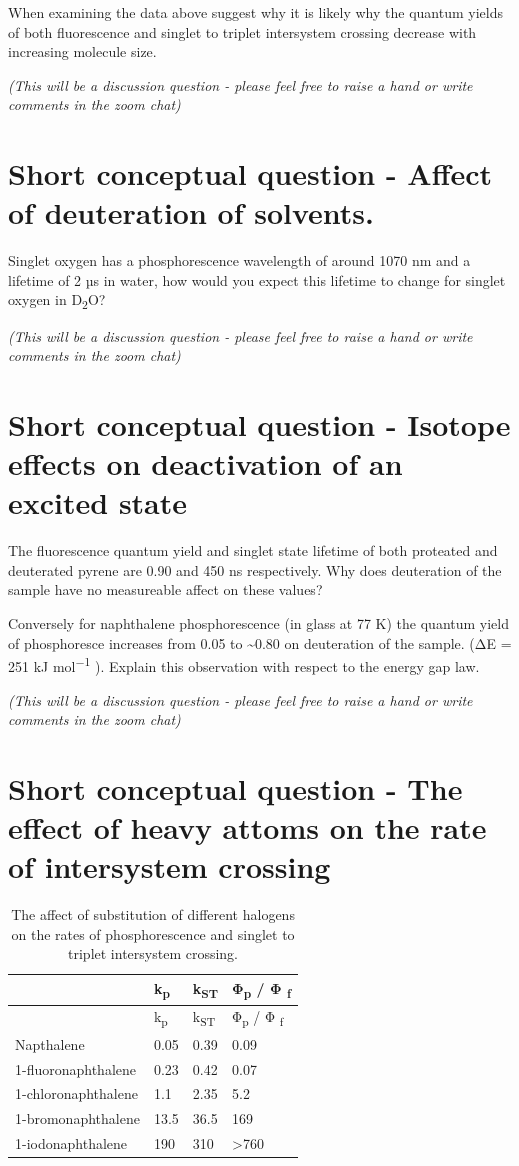\documentclass[
]{book}
\begin{document}
When examining the data above suggest why it is likely why the quantum yields of both fluorescence and singlet to triplet intersystem crossing decrease with increasing molecule size.

\emph{(This will be a discussion question - please feel free to raise a hand or write comments in the zoom chat)}

\hypertarget{sec:dsolvent}{%
\section{Short conceptual question - Affect of deuteration of solvents.}\label{sec:dsolvent}}

Singlet oxygen has a phosphorescence wavelength of around 1070 nm and a lifetime of 2 µs in water, how would you expect this lifetime to change for singlet oxygen in D\textsubscript{2}O?

\emph{(This will be a discussion question - please feel free to raise a hand or write comments in the zoom chat)}

\hypertarget{sec:isotope}{%
\section{Short conceptual question - Isotope effects on deactivation of an excited state}\label{sec:isotope}}

The fluorescence quantum yield and singlet state lifetime of both proteated and deuterated pyrene are 0.90 and 450 ns respectively. Why does deuteration of the sample have no measureable affect on these values?

Conversely for naphthalene phosphorescence (in glass at 77 K) the quantum yield of phosphoresce increases from 0.05 to \textasciitilde0.80 on deuteration of the sample. (ΔE = 251 kJ mol\textsuperscript{−1} ). Explain this observation with respect to the energy gap law.

\emph{(This will be a discussion question - please feel free to raise a hand or write comments in the zoom chat)}

\hypertarget{sec:heavy}{%
\section{Short conceptual question - The effect of heavy attoms on the rate of intersystem crossing}\label{sec:heavy}}

\begin{longtable}[]{@{}llll@{}}
\caption{\label{tab:heavyatom} The affect of substitution of different halogens on the rates of phosphorescence and singlet to triplet intersystem crossing.}\tabularnewline
\toprule
& k\textsubscript{p} & k\textsubscript{ST} & Φ\textsubscript{p} / Φ \textsubscript{f}\tabularnewline
\midrule
\endfirsthead
\toprule
& k\textsubscript{p} & k\textsubscript{ST} & Φ\textsubscript{p} / Φ \textsubscript{f}\tabularnewline
\midrule
\endhead
Napthalene & 0.05 & 0.39 & 0.09\tabularnewline
1-fluoronaphthalene & 0.23 & 0.42 & 0.07\tabularnewline
1-chloronaphthalene & 1.1 & 2.35 & 5.2\tabularnewline
1-bromonaphthalene & 13.5 & 36.5 & 169\tabularnewline
1-iodonaphthalene & 190 & 310 & \textgreater760\tabularnewline
\bottomrule
\end{longtable}
\end{document}
